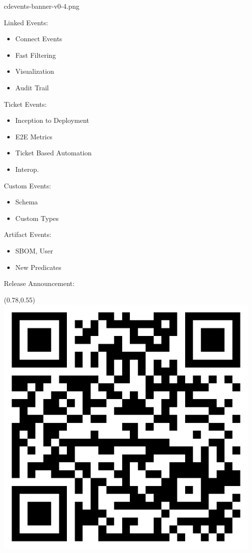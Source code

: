 \documentclass[aspectratio=169,11pt,hyperref={colorlinks=true}]{beamer}
\begin{document}
\begin{tpicstripedframe}%
  {cdevents-banner-v0-4.png}
  {%
  Linked Events:
  \vspace{0.01\textheight}
  \begin{itemize}
    \item Connect Events
    \item Fast Filtering
    \item Visualization
    \item Audit Trail
  \end{itemize}
  }%
  {%
  Ticket Events:
  \vspace{0.01\textheight}
  \begin{itemize}
    \item Inception to Deployment
    \item E2E Metrics
    \item Ticket Based Automation
    \item Interop.
  \end{itemize}
  }%
  {%
  Custom Events:
  \vspace{0.01\textheight}
  \begin{itemize}
    \item Schema
    \item Custom Types
  \end{itemize}
  \vspace{0.03\textheight}
  Artifact Events:
  \vspace{0.01\textheight}
  \begin{itemize}
    \item SBOM, User
    \item New Predicates
  \end{itemize}
  }%
  {%
  Release Announcement:
  \begin{textblock*}{0.17\paperwidth}(0.78\paperwidth,0.55\paperheight)
    \includegraphics[width=0.17\paperwidth]{img/cdevents-v4-release-announcement.png}
  \end{textblock*}
  }%
\end{tpicstripedframe}
\end{document}
